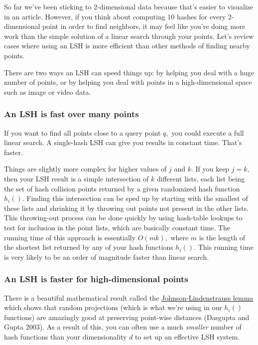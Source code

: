 \documentclass[20pt,]{extarticle}
\begin{document}
So far we've been sticking to 2-dimensional data because that's easier
to visualize in an article. However, if you think about computing 10
hashes for every 2-dimensional point in order to find neighbors, it may
feel like you're doing more work than the simple solution of a linear
search through your points. Let's review cases where using an LSH is
more efficient than other methods of finding nearby points.

There are two ways an LSH can speed things up: by helping you deal with
a huge number of points, or by helping you deal with points in a
high-dimensional space such as image or video data.

\subsubsection{An LSH is fast over many
points}\label{an-lsh-is-fast-over-many-points}

If you want to find all points close to a query point \(q,\) you could
execute a full linear search. A single-hash LSH can give you results in
constant time. That's faster.

Things are slightly more complex for higher values of \(j\) and \(k.\)
If you keep \(j=k,\) then your LSH result is a simple intersection of
\(k\) different lists, each list being the set of hash collision points
returned by a given randomized hash function \(h_i().\) Finding this
intersection can be sped up by starting with the smallest of these lists
and shrinking it by throwing out points not present in the other lists.
This throwing-out process can be done quickly by using hash-table
lookups to test for inclusion in the point lists, which are basically
constant time. The running time of this approach is essentially
\(O(mk),\) where \(m\) is the length of the shortest list returned by
any of your hash functions \(h_i().\) This running time is very likely
to be an order of magnitude faster than linear search.

\subsubsection{An LSH is faster for high-dimensional
points}\label{an-lsh-is-faster-for-high-dimensional-points}

There is a beautiful mathematical result called the
\href{https://en.wikipedia.org/wiki/Johnson\%E2\%80\%93Lindenstrauss_lemma}{Johnson-Lindenstrauss
lemma} which shows that random projections (which is what we're using in
our \(h_i()\) functions) are amazingly good at preserving point-wise
distances (Dasgupta and Gupta 2003). As a result of this, you can often
use a much \emph{smaller} number of hash functions than your
dimensionality \(d\) to set up an effective LSH system.
\end{document}
